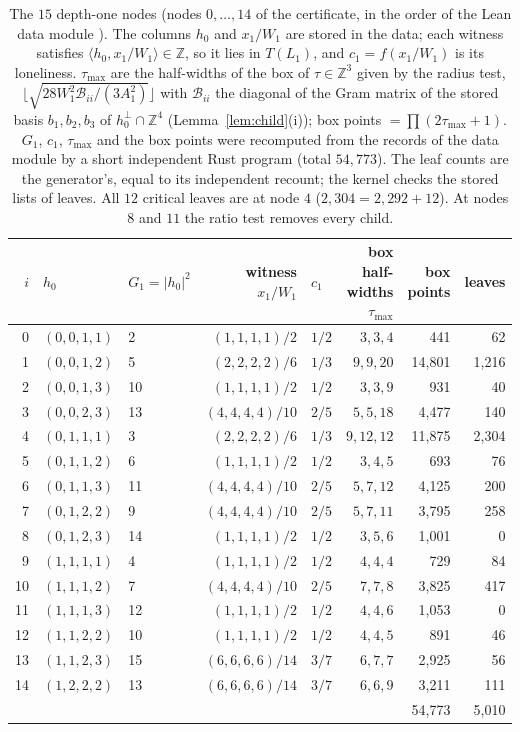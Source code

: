 \documentclass[11pt]{article}
\theoremstyle{remark}
\newcommand{\Z}{\mathbb{Z}}
\newcommand{\lean}[1]{{\small\texttt{\detokenize{#1}}}}
\begin{document}
\begin{table}[ht]
\centering\small
\begin{tabular}{rllrlrrr}
\toprule
$i$ & $h_0$ & $G_1=|h_0|^2$ & witness $x_1/W_1$ & $c_1$ & box half-widths $\tau_{\max}$ & box points & leaves\\
\midrule
0 & $(0,0,1,1)$ & 2 & $(1,1,1,1)/2$ & $1/2$ & $3,3,4$ & 441 & 62\\
1 & $(0,0,1,2)$ & 5 & $(2,2,2,2)/6$ & $1/3$ & $9,9,20$ & 14,801 & 1,216\\
2 & $(0,0,1,3)$ & 10 & $(1,1,1,1)/2$ & $1/2$ & $3,3,9$ & 931 & 40\\
3 & $(0,0,2,3)$ & 13 & $(4,4,4,4)/10$ & $2/5$ & $5,5,18$ & 4,477 & 140\\
4 & $(0,1,1,1)$ & 3 & $(2,2,2,2)/6$ & $1/3$ & $9,12,12$ & 11,875 & 2,304\\
5 & $(0,1,1,2)$ & 6 & $(1,1,1,1)/2$ & $1/2$ & $3,4,5$ & 693 & 76\\
6 & $(0,1,1,3)$ & 11 & $(4,4,4,4)/10$ & $2/5$ & $5,7,12$ & 4,125 & 200\\
7 & $(0,1,2,2)$ & 9 & $(4,4,4,4)/10$ & $2/5$ & $5,7,11$ & 3,795 & 258\\
8 & $(0,1,2,3)$ & 14 & $(1,1,1,1)/2$ & $1/2$ & $3,5,6$ & 1,001 & 0\\
9 & $(1,1,1,1)$ & 4 & $(1,1,1,1)/2$ & $1/2$ & $4,4,4$ & 729 & 84\\
10 & $(1,1,1,2)$ & 7 & $(4,4,4,4)/10$ & $2/5$ & $7,7,8$ & 3,825 & 417\\
11 & $(1,1,1,3)$ & 12 & $(1,1,1,1)/2$ & $1/2$ & $4,4,6$ & 1,053 & 0\\
12 & $(1,1,2,2)$ & 10 & $(1,1,1,1)/2$ & $1/2$ & $4,4,5$ & 891 & 46\\
13 & $(1,1,2,3)$ & 15 & $(6,6,6,6)/14$ & $3/7$ & $6,7,7$ & 2,925 & 56\\
14 & $(1,2,2,2)$ & 13 & $(6,6,6,6)/14$ & $3/7$ & $6,6,9$ & 3,211 & 111\\
\midrule
 & & & & & & 54,773 & 5,010\\
\bottomrule
\end{tabular}
\caption{The $15$ depth-one nodes (nodes $0,\dots,14$ of the certificate, in the order of the Lean data module \lean{L4S5.Data}). The columns $h_0$ and $x_1/W_1$ are stored in the data; each witness satisfies $\langle h_0,x_1/W_1\rangle\in\Z$, so it lies in $T(L_1)$, and $c_1=f(x_1/W_1)$ is its loneliness. $\tau_{\max}$ are the half-widths of the box of $\tau\in\Z^3$ given by the radius test, $\lfloor\sqrt{28W_1^2\mathcal B_{ii}/(3A_1^2)}\rfloor$ with $\mathcal B_{ii}$ the diagonal of the Gram matrix of the stored basis $b_1,b_2,b_3$ of $h_0^\perp\cap\Z^4$ (Lemma~\ref{lem:child}(i)); box points $=\prod(2\tau_{\max}+1)$. $G_1$, $c_1$, $\tau_{\max}$ and the box points were recomputed from the records of the data module by a short independent Rust program (total $54{,}773$). The leaf counts are the generator's, equal to its independent recount; the kernel checks the stored lists of leaves. All $12$ critical leaves are at node $4$ ($2{,}304=2{,}292+12$). At nodes $8$ and $11$ the ratio test removes every child.}
\label{tab:nodes}
\end{table}
\end{document}
